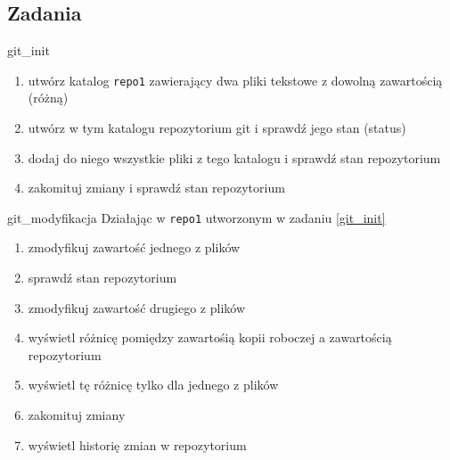 
\subsection{Zadania}

\begin{Zadanie}{}{git_init}
\begin{enumerate}
\item utwórz katalog \Verb#repo1# zawierający dwa pliki tekstowe z dowolną zawartością (różną)
\item utwórz w tym katalogu repozytorium git i sprawdź jego stan (status)
\item dodaj do niego wszystkie pliki z tego katalogu i sprawdź stan repozytorium
\item zakomituj zmiany i sprawdź stan repozytorium
\end{enumerate}
\end{Zadanie}

\begin{Zadanie}{}{git_modyfikacja}
Działając w \Verb#repo1# utworzonym w zadaniu \ref{git_init}
\begin{enumerate}
\item zmodyfikuj zawartość jednego z plików
\item sprawdź stan repozytorium
\item zmodyfikuj zawartość drugiego z plików
\item wyświetl różnicę pomiędzy zawartośią kopii roboczej a zawartością repozytorium
\item wyświetl tę różnicę tylko dla jednego z plików
\item zakomituj zmiany
\item wyświetl historię zmian w repozytorium
\end{enumerate}
\end{Zadanie}

